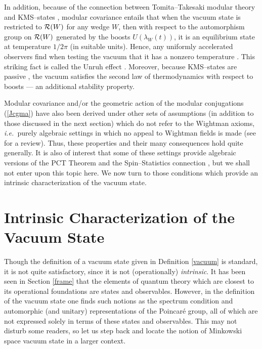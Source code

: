 \documentclass[12pt]{article}
\newcommand{\ie}{{\it i.e.\ }}
\def\Rs{{\cal R}}
\begin{document}
     In addition, because of the connection between Tomita--Takesaki
modular theory and KMS--states \cite{BrRo2}, modular covariance
entails that when the vacuum state is restricted to $\Rs(W)$ for any
wedge $W$, then with respect to the automorphism group on $\Rs(W)$
generated by the boosts $U(\lambda_W(t))$, it is an equilibrium
state at temperature $1/2 \pi$ (in suitable units). Hence, any
uniformly accelerated observers find when testing the vacuum that it
has a nonzero temperature \cite{Sew}. This striking fact is called the
Unruh effect \cite{Un}. Moreover, because KMS--states are passive
\cite{PuWo}, the vacuum satisfies the second law of thermodynamics
with respect to boosts --- an additional stability property.

     Modular covariance and/or the geometric action of the modular
conjugations (\ref{Jcgma}) have also been derived under other sets of
assumptions (in addition to those discussed in the next section) which
do not refer to the Wightman axioms, \ie purely algebraic settings in
which no appeal to Wightman fields is made \cite{BrGuLo2,Mu,Ku4,Tr}
(see \cite{Bor3} for a review). Thus, these properties and their many
consequences hold quite generally. It is also of interest that some of
these settings provide algebraic versions of the PCT Theorem and the
Spin--Statistics connection \cite{BrGuLo2,GuLo,Mu,Ku1,KuLo}, but we
shall not enter upon this topic here.  We now turn to those conditions
which provide an intrinsic characterization of the vacuum state.


\section{Intrinsic Characterization of the Vacuum State} 
\label{charact}

     Though the definition of a vacuum state given in Definition
\ref{vacuum} is standard, it is not quite satisfactory, since it is
not (operationally) {\it intrinsic}.  It has been seen in Section
\ref{frame} that the elements of quantum theory which are closest to
its operational foundations are states and observables. However, in
the definition of the vacuum state one finds such notions as the
spectrum condition and automorphic (and unitary) representations of
the Poincar\'e group, all of which are not expressed solely in terms
of these states and observables. This may not disturb some readers, so
let us step back and locate the notion of Minkowski space vacuum state
in a larger context.
\end{document}
